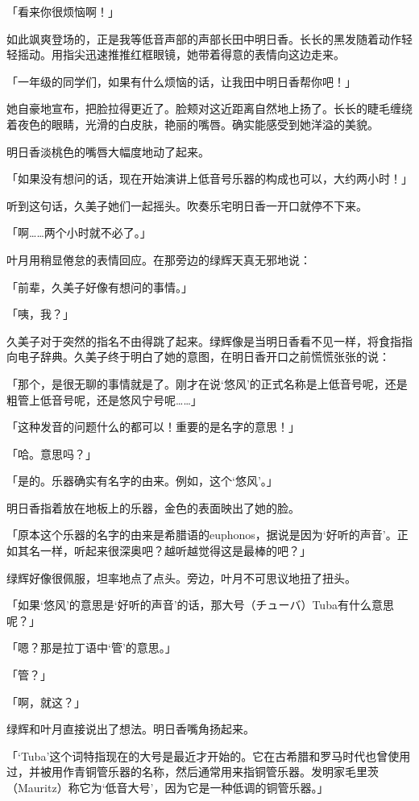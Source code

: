 \documentclass[UTF8]{ctexart}
\begin{document}
    「看来你很烦恼啊！」

    如此飒爽登场的，正是我等低音声部的声部长田中明日香。长长的黑发随着动作轻轻摇动。用指尖迅速推推红框眼镜，她带着得意的表情向这边走来。

    「一年级的同学们，如果有什么烦恼的话，让我田中明日香帮你吧！」

    她自豪地宣布，把脸拉得更近了。脸颊对这近距离自然地上扬了。长长的睫毛缠绕着夜色的眼睛，光滑的白皮肤，艳丽的嘴唇。确实能感受到她洋溢的美貌。

    明日香淡桃色的嘴唇大幅度地动了起来。

    「如果没有想问的话，现在开始演讲上低音号乐器的构成也可以，大约两小时！」

    听到这句话，久美子她们一起摇头。吹奏乐宅明日香一开口就停不下来。

    「啊……两个小时就不必了。」

    叶月用稍显倦怠的表情回应。在那旁边的绿辉天真无邪地说：

    「前辈，久美子好像有想问的事情。」

    「咦，我？」

    久美子对于突然的指名不由得跳了起来。绿辉像是当明日香看不见一样，将食指指向电子辞典。久美子终于明白了她的意图，在明日香开口之前慌慌张张的说：

    「那个，是很无聊的事情就是了。刚才在说‘悠风’的正式名称是上低音号呢，还是粗管上低音号呢，还是悠风宁号呢……」

    「这种发音的问题什么的都可以！重要的是名字的意思！」

    「哈。意思吗？」

    「是的。乐器确实有名字的由来。例如，这个‘悠风’。」

    明日香指着放在地板上的乐器，金色的表面映出了她的脸。

    「原本这个乐器的名字的由来是希腊语的euphonos，据说是因为‘好听的声音’。正如其名一样，听起来很深奥吧？越听越觉得这是最棒的吧？」

    绿辉好像很佩服，坦率地点了点头。旁边，叶月不可思议地扭了扭头。

    「如果‘悠风’的意思是‘好听的声音’的话，那大号（チューバ）Tuba有什么意思呢？」

    「嗯？那是拉丁语中‘管’的意思。」

    「管？」

    「啊，就这？」

    绿辉和叶月直接说出了想法。明日香嘴角扬起来。

    「‘Tuba’这个词特指现在的大号是最近才开始的。它在古希腊和罗马时代也曾使用过，并被用作青铜管乐器的名称，然后通常用来指铜管乐器。发明家毛里茨（Mauritz）称它为‘低音大号’，因为它是一种低调的铜管乐器。」
\end{document}
